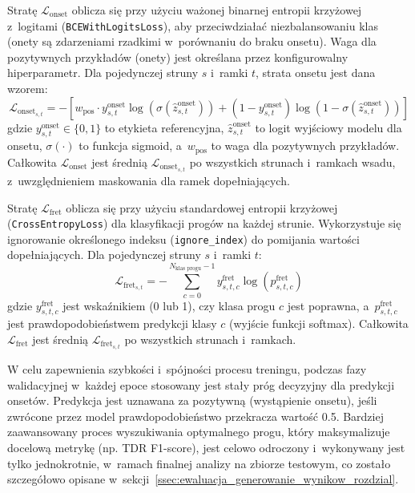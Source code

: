 Stratę $\mathcal{L}_{\text{onset}}$ oblicza się przy użyciu ważonej binarnej entropii krzyżowej z~logitami (\texttt{BCEWithLogitsLoss}), aby przeciwdziałać niezbalansowaniu klas (onety są zdarzeniami rzadkimi w~porównaniu do braku onsetu). Waga dla pozytywnych przykładów (onety) jest określana przez konfigurowalny hiperparametr. Dla pojedynczej struny $s$ i~ramki $t$, strata onsetu jest dana wzorem:
\begin{equation}
    \mathcal{L}_{\text{onset}_{s,t}} = - [w_{\text{pos}} \cdot y_{s,t}^{\text{onset}} \log(\sigma(\hat{z}_{s,t}^{\text{onset}})) + (1-y_{s,t}^{\text{onset}})\log(1-\sigma(\hat{z}_{s,t}^{\text{onset}}))]
    \label{eq:onset_loss_formula}
\end{equation}
gdzie $y_{s,t}^{\text{onset}} \in \{0,1\}$ to etykieta referencyjna, $\hat{z}_{s,t}^{\text{onset}}$ to logit wyjściowy modelu dla onsetu, $\sigma(\cdot)$ to funkcja sigmoid, a~$w_{\text{pos}}$ to waga dla pozytywnych przykładów. Całkowita $\mathcal{L}_{\text{onset}}$ jest średnią $\mathcal{L}_{\text{onset}_{s,t}}$ po wszystkich strunach i~ramkach wsadu, z~uwzględnieniem maskowania dla ramek dopełniających.

Stratę $\mathcal{L}_{\text{fret}}$ oblicza się przy użyciu standardowej entropii krzyżowej (\texttt{CrossEntropyLoss}) dla klasyfikacji progów na każdej strunie. Wykorzystuje się ignorowanie określonego indeksu (\texttt{ignore\_index}) do pomijania wartości dopełniających. Dla pojedynczej struny $s$ i~ramki $t$:
\begin{equation}
    \mathcal{L}_{\text{fret}_{s,t}} = - \sum_{c=0}^{N_{\text{klas progu}}-1} y_{s,t,c}^{\text{fret}} \log(p_{s,t,c}^{\text{fret}})
    \label{eq:fret_loss_formula}
\end{equation}
gdzie $y_{s,t,c}^{\text{fret}}$ jest wskaźnikiem (0 lub 1), czy klasa progu $c$ jest poprawna, a~$p_{s,t,c}^{\text{fret}}$ jest prawdopodobieństwem predykcji klasy $c$ (wyjście funkcji softmax). Całkowita $\mathcal{L}_{\text{fret}}$ jest średnią $\mathcal{L}_{\text{fret}_{s,t}}$ po wszystkich strunach i~ramkach.

W celu zapewnienia szybkości i~spójności procesu treningu, podczas fazy walidacyjnej w~każdej epoce stosowany jest stały próg decyzyjny dla predykcji onsetów. Predykcja jest uznawana za pozytywną (wystąpienie onsetu), jeśli zwrócone przez model prawdopodobieństwo przekracza wartość 0.5. Bardziej zaawansowany proces wyszukiwania optymalnego progu, który maksymalizuje docelową metrykę (np. TDR F1-score), jest celowo odroczony i~wykonywany jest tylko jednokrotnie, w~ramach finalnej analizy na zbiorze testowym, co zostało szczegółowo opisane w~sekcji~\ref{ssec:ewaluacja_generowanie_wynikow_rozdzial}.

